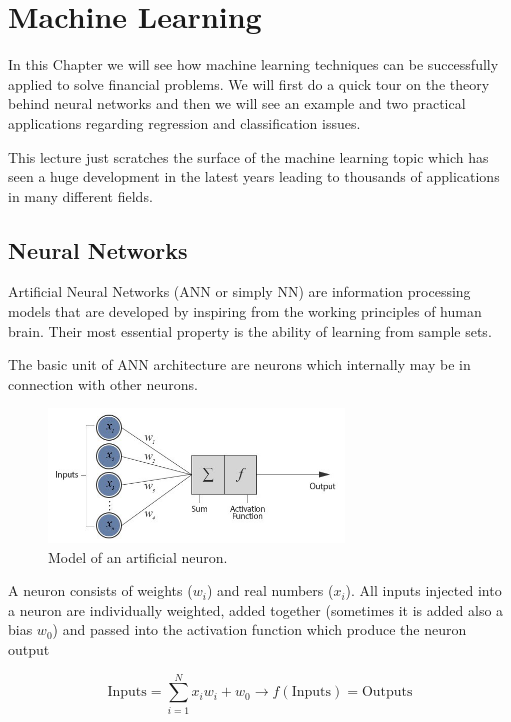 \chapter{Machine Learning}\label{neural-network---practical-lesson-8}

In this Chapter we will see how machine learning techniques can be
successfully applied to solve financial problems. We will first do a
quick tour on the theory behind neural networks and then we will see an
example and two practical applications regarding regression and
classification issues.

This lecture just scratches the surface of the
machine learning topic which has seen a huge development in the latest
years leading to thousands of applications in many different fields.
    
\section{Neural Networks}\label{neural-networks}

Artificial Neural Networks (ANN or simply NN) are information processing
models that are developed by inspiring from the working principles of
human brain. Their most essential property is the ability of learning
from sample sets.

The basic unit of ANN architecture are neurons which internally may be in
connection with other neurons.

\begin{figure}[htb]
	\centering
	\includegraphics[width=0.7\textwidth]{figures/neuron}
	\caption{Model of an artificial neuron.}
        \label{fig:neuron}
\end{figure}

A neuron consists of weights (\(w_i\)) and real numbers (\(x_i\)). All
inputs injected into a neuron are individually weighted, added together
(sometimes it is added also a bias \(w_0\)) and passed into the
activation function which produce the neuron output

\[ \textrm{Inputs} = \sum_{i=1}^{N} x_i w_i +w_0 \rightarrow f(\textrm{Inputs}) = \textrm{Outputs}\]

